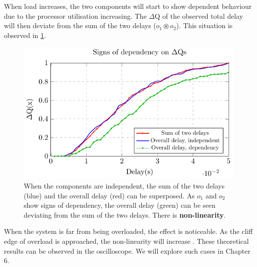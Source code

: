         When load increases, the two components will start to show dependent behaviour due to the processor utilisation increasing. The $\Delta$Q of the observed total delay will then deviate from the sum of the two delays ($o_1 \circledast o_2$). This situation is observed in \cref{fig:cdf_indep}.
        
        \begin{figure}[H]
            \begin{center}
                \includegraphics[scale=1]{tikz/cdf_indep.pdf}
            \end{center}
            \caption{When the components are independent, the sum of the two delays (blue) and the overall delay (red) can be superposed. As $o_1$ and $o_2$ show signs of dependency, the overall delay (green) can be seen deviating from the sum of the two delays. There is \textbf{non-linearity}.}
            \label{fig:cdf_indep}%
        \end{figure}%

        When the system is far from being overloaded, the effect is noticeable. As the cliff edge of overload is approached, the non-linearity will increase \cite{dq-tut} \cite{post}. These theoretical results can be observed in the oscilloscope. We will explore such cases in Chapter 6.
